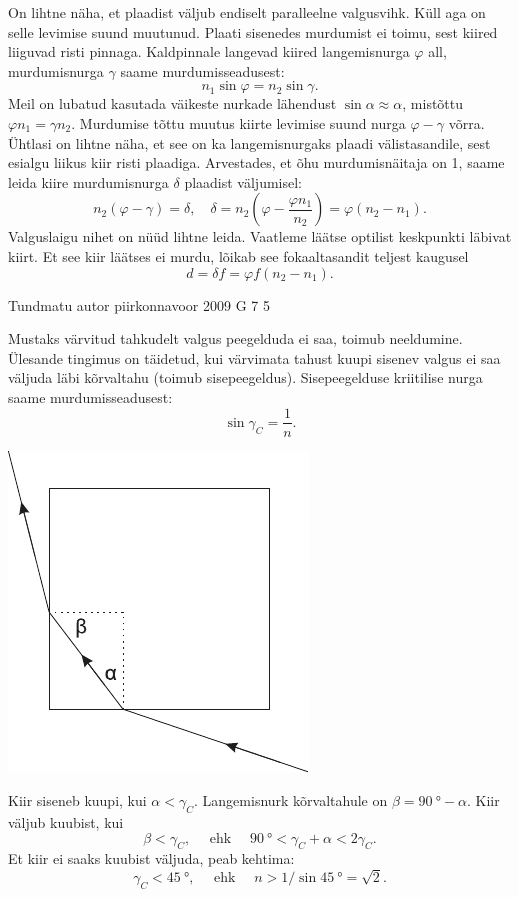 \documentclass[11pt]{article}
\begin{document}
{{\ifSolution
On lihtne näha, et plaadist väljub endiselt paralleelne valgusvihk. Küll aga on selle levimise suund muutunud. Plaati sisenedes murdumist ei toimu, sest kiired liiguvad risti pinnaga. Kaldpinnale langevad kiired langemisnurga $\varphi$ all, murdumisnurga $\gamma$ saame murdumisseadusest:
\[
n_1 \sin \varphi = n_2 \sin \gamma.
\]
Meil on lubatud kasutada väikeste nurkade lähendust $\sin \alpha \approx \alpha$, mistõttu $\varphi n_1 = \gamma n_2$. Murdumise tõttu muutus kiirte levimise suund nurga $\varphi -\gamma$ võrra. Ühtlasi on lihtne näha, et see on ka langemisnurgaks plaadi välistasandile, sest esialgu liikus kiir risti plaadiga. Arvestades, et õhu murdumisnäitaja on 1, saame leida kiire murdumisnurga $\delta$ plaadist väljumisel:
\[
n_{2}(\varphi-\gamma)=\delta, \quad \delta=n_{2}\left(\varphi-\frac{\varphi n_{1}}{n_{2}}\right)=\varphi\left(n_{2}-n_{1}\right).
\]
Valguslaigu nihet on nüüd lihtne leida. Vaatleme läätse optilist keskpunkti
läbivat kiirt. Et see kiir läätses ei murdu, lõikab see fokaaltasandit teljest kaugusel
\[
d = \delta f = \varphi f (n_2 - n_1).
\]
\fi
}

{Tundmatu autor} %
{piirkonnavoor} %
{2009} %
{G 7} %
{5} %
{

\ifSolution
Mustaks värvitud tahkudelt valgus peegelduda ei saa, toimub neeldumine. Ülesande tingimus on täidetud, kui värvimata tahust kuupi sisenev valgus ei saa
väljuda läbi kõrvaltahu (toimub sisepeegeldus). Sisepeegelduse kriitilise nurga saame murdumisseadusest:
\[
\sin \gamma_{C}=\frac{1}{n}.
\]

\begin{center}
	\includegraphics[width=0.45\linewidth]{2009-v2g-07-lah}
\end{center}

Kiir siseneb kuupi, kui $\alpha<\gamma_{C}$. Langemisnurk kõrvaltahule on $\beta = \SI{90}{\degree} - \alpha$. Kiir väljub kuubist, kui
\[
\beta<\gamma_{C}, \quad \text { ehk } \quad \SI{90}{\degree}<\gamma_{C}+\alpha<2 \gamma_{C}.
\]
Et kiir ei saaks kuubist väljuda, peab kehtima:
\[
\gamma_{C}<\SI{45}{\degree}, \quad \text { ehk } \quad n>1 / \sin \SI{45}{\degree}=\sqrt{2}.
\]
\fi
}

}
\end{document}
